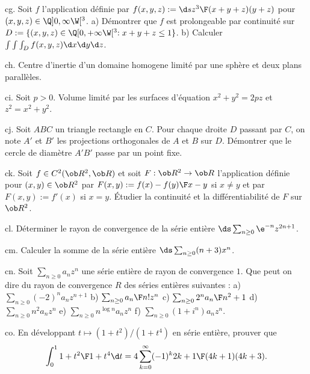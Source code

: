 \exo [Level=2,Fight=2,Learn=1,Field=\IntégralesMultiples|\FonctionsDePlusieursVariables,Type=\Exercices,Origin=]  cg. 
Soit $f$ l'application 
définie par $f(x,y,z):=\d s{z^3\F (x+y+z)(y+z)}$ pour $(x,y,z)\in\Q]0,\infty\W[^3$. \pn
a) Démontrer que $f$ est prolongeable par continuité sur 
$D:=\{(x,y,z)\in\Q[0,+\infty\W[^3:x+y+z\le 1\}$. \pn
b) Calculer $\int\int\int_Df(x,y,z)\d x\d y\d z$. 

\exo [Level=2,Fight=2,Learn=1,Field=\IntégralesMultiples,Type=\Exercices,Origin=] ch. 
Centre d'inertie d'un domaine homogene limité 
par une sphère et deux plans parallèles. 

\exo [Level=2,Fight=2,Learn=1,Field=\Volumes,Type=\Exercices,Origin=] ci. 
Soit $p>0$. 
Volume limité par les surfaces d'équation $x^2+y^2=2pz$ et $z^2=x^2+y^2$. 

\exo [Level=1,Fight=2,Learn=1,Field=\GéométriePlane,Type=\Exercices,Origin=]  cj. 
Soit $ABC$ un triangle rectangle en $C$. Pour chaque droite $D$ passant par $C$, 
on note $A'$ et $B'$ les projections orthogonales de $A$ et $B$ sur $D$. 
Démontrer que le cercle de diamètre $A'B'$ passe par un point fixe. 

\exo [Level=2,Fight=2,Learn=1,Field=\FonctionsDePlusieursVariables,Type=\Exercices,Origin=] ck. 
Soit $f\in\sc C^2(\ob R^2,\ob R)$ et soit $F:\ob R^2\to\ob R$ l'application 
définie pour $(x,y)\in\ob R^2$ par 
$F(x,y):={f(x)-f(y)\F x-y}$ si $x\neq y$ et par $F(x,y):=f'(x)$ si $x=y$. 
Étudier la continuité et la différentiabilité de $F$ sur $\ob R^2$. 

\exo [Level=2,Fight=0,Learn=0,Field=\SériesEntières,Type=\Exercices,Origin=] cl. 
Déterminer le rayon de convergence de la  série entière $\ds\sum_{n\ge0}\e^{-n}z^{2n+1}$. 

\exo [Level=2,Fight=1,Learn=0,Field=\SériesEntières,Type=\Exercices,Origin=] cm. 
Calculer la somme de la série entière $\ds\sum_{n\ge0}(n+3)x^n$.


\exo [Level=2,Fight=1,Learn=0,Field=\SériesEntières,Type=\Exercices,Origin=] cn. 
Soit $\sum_{n\ge0}a_nz^n$ une série entière de rayon de convergence $1$. 
Que peut on dire du rayon de convergence $R$ des séries entières suivantes : \pn
a) $\sum_{n\ge0}(-2)^na_nz^{n+1}$\qquad
b) $\sum_{n\ge0}{a_n\F n!}z^n$\qquad
c) $\sum_{n\ge0}{2^na_n\F n^2+1}$\qquad
d) $\sum_{n\ge0}n^2a_nz^n$\qquad
e) $\sum_{n\ge0}n^{\log n}a_n z^n$\qquad
f) $\sum_{n\ge0}(1+i^n)a_nz^n$. 

\exo [Level=2,Fight=2,Learn=2,Field=\SériesEntières,Type=\Exercices,Origin=] co. 
En développant $t\mapsto(1+t^2)/(1+t^4)$ en série entière, prouver que 
$$
\int_0^1{1+t^2\F1+t^4}\d t=4\sum_{k=0}^\infty(-1)^k{2k+1\F(4k+1)(4k+3)}.
$$

